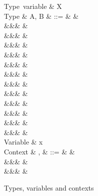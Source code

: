 \begin{figure}
\begin{syntaxfig}
\mbox{Type variable}
&
X
\\[2mm]
\mbox{Type}
&
A, B
&
::=
&
&
\\
&&&
\tyUnit
&
\\
&&&
&
\\
&&&
&
\\
&&&
&
\\
&&&
&
\\
&&&
&
\\
&&&
&
\\
&&&
&
\\
&&&
&
\\
&&&
&
\\
&&&
&
\\
&&&
&
\\[2mm]
\mbox{Variable}
&
x
\\[2mm]
\mbox{Context}
&
\Gamma, \Delta
&
::=
&
\cxtEmpty
&
\\
&&&
&
\\
&&&
&
\\[2mm]
\end{syntaxfig}
\caption{Types, variables and contexts}
\end{figure}

